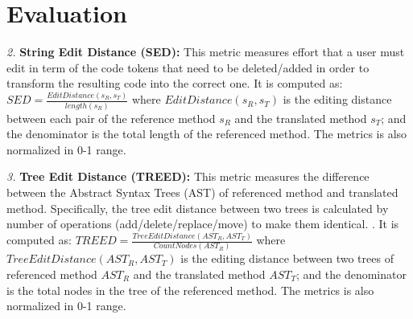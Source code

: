 \section{Evaluation}
\emph{2.} \textbf{String Edit Distance (SED):} This metric measures
effort that a user must edit in term of the code tokens
that need to be deleted/added in order to transform the
resulting code into the correct one. It is computed as:  $SED = \frac{EditDistance\left(s_R, s_T\right)}{length\left(s_R\right)}$ where $EditDistance\left(s_R, s_T\right)$ is the editing distance between each pair of the reference method $s_R$ and the translated method $s_T$; and the denominator is the total length of the referenced method. The metrics is also normalized in 0-1 range.

\emph{3.} \textbf{Tree Edit Distance (TREED):} This metric measures the difference between the Abstract Syntax Trees (AST) of referenced method and translated method. Specifically, the tree edit distance between two trees is calculated by number of operations (add/delete/replace/move) to make them identical. \cite{algorithm}. 
It is computed as:  $TREED = \frac{TreeEditDistance\left(AST_R, AST_T\right)}{CountNodes \left(AST_R\right)}$ where $TreeEditDistance\left(AST_R, AST_T\right)$ is the editing distance between two trees of referenced method $AST_R$ and the translated method $AST_T$; and the denominator is the total nodes in the tree of the referenced method.  The metrics is also normalized in 0-1 range.